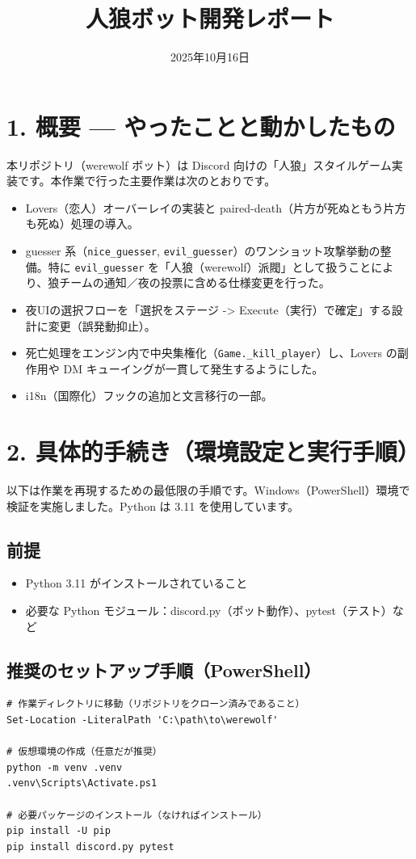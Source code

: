 \documentclass[12pt,a4paper]{article}
\title{人狼ボット開発レポート}
\author{}
\date{2025年10月16日}
\begin{document}
\maketitle

\section*{1. 概要 — やったことと動かしたもの}

本リポジトリ（werewolf ボット）は Discord 向けの「人狼」スタイルゲーム実装です。本作業で行った主要作業は次のとおりです。

\begin{itemize}
  \item Lovers（恋人）オーバーレイの実装と paired-death（片方が死ぬともう片方も死ぬ）処理の導入。
  \item guesser 系（\texttt{nice\_guesser}, \texttt{evil\_guesser}）のワンショット攻撃挙動の整備。特に \texttt{evil\_guesser} を「人狼（werewolf）派閥」として扱うことにより、狼チームの通知／夜の投票に含める仕様変更を行った。
  \item 夜UIの選択フローを「選択をステージ -> Execute（実行）で確定」する設計に変更（誤発動抑止）。
  \item 死亡処理をエンジン内で中央集権化（\texttt{Game.\_kill\_player}）し、Lovers の副作用や DM キューイングが一貫して発生するようにした。
  \item i18n（国際化）フックの追加と文言移行の一部。
\end{itemize}

\section*{2. 具体的手続き（環境設定と実行手順）}

以下は作業を再現するための最低限の手順です。Windows（PowerShell）環境で検証を実施しました。Python は 3.11 を使用しています。

\subsection*{前提}

\begin{itemize}
  \item Python 3.11 がインストールされていること
  \item 必要な Python モジュール：discord.py（ボット動作）、pytest（テスト）など
\end{itemize}

\subsection*{推奨のセットアップ手順（PowerShell）}
\begin{verbatim}
# 作業ディレクトリに移動（リポジトリをクローン済みであること）
Set-Location -LiteralPath 'C:\path\to\werewolf'

# 仮想環境の作成（任意だが推奨）
python -m venv .venv
.venv\Scripts\Activate.ps1

# 必要パッケージのインストール（なければインストール）
pip install -U pip
pip install discord.py pytest
\end{verbatim}
\end{document}
